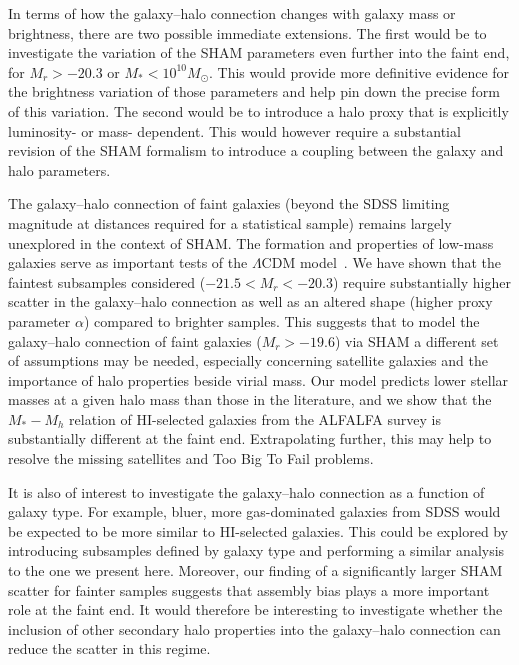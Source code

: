 \documentclass[usenatbib,useAMS]{mnras}
\newcommand{\HI}{\ensuremath{\mathrm{H}\scriptstyle\mathrm{I}}}
\begin{document}
In terms of how the galaxy--halo connection changes with galaxy mass or brightness, there are two possible immediate extensions. The first would be to investigate the variation of the \ac{SHAM} parameters even further into the faint end, for $M_r > -20.3$ or $M_* < 10^{10} M_\odot$. This would provide more definitive evidence for the brightness variation of those parameters and help pin down the precise form of this variation. The second would be to introduce a halo proxy that is explicitly luminosity- or mass- dependent. This would however require a substantial revision of the \acl{SHAM} formalism to introduce a coupling between the galaxy and halo parameters.

The galaxy--halo connection of faint galaxies (beyond the \ac{SDSS} limiting magnitude at distances required for a statistical sample) remains largely unexplored in the context of \acl{SHAM}. The formation and properties of low-mass galaxies serve as important tests of the $\Lambda$CDM model~\citep{Bullock}. We have shown that the faintest subsamples considered ($-21.5 < M_r < -20.3$) require substantially higher scatter in the galaxy--halo connection as well as an altered shape (higher proxy parameter $\alpha$) compared to brighter samples. This suggests that to model the galaxy--halo connection of faint galaxies ($M_r > -19.6$) via \ac{SHAM} a different set of assumptions may be needed, especially concerning satellite galaxies and the importance of halo properties beside virial mass. Our model predicts lower stellar masses at a given halo mass than those in the literature, and we show that the $M_*-M_h$ relation of $\HI$-selected galaxies from the ALFALFA survey is substantially different at the faint end. Extrapolating further, this may help to resolve the missing satellites \citep{Klypin, Moore} and Too Big To Fail \citep{TBTF} problems.


It is also of interest to investigate the galaxy--halo connection as a function of galaxy type. For example, bluer, more gas-dominated galaxies from \ac{SDSS} would be expected to be more similar to $\HI$-selected galaxies. This could be explored by introducing subsamples defined by galaxy type and performing a similar analysis to the one we present here. Moreover, our finding of a significantly larger \ac{SHAM} scatter for fainter samples suggests that assembly bias plays a more important role at the faint end. It would therefore be interesting to investigate whether the inclusion of other secondary halo properties into the galaxy--halo connection can reduce the scatter in this regime.
\end{document}
